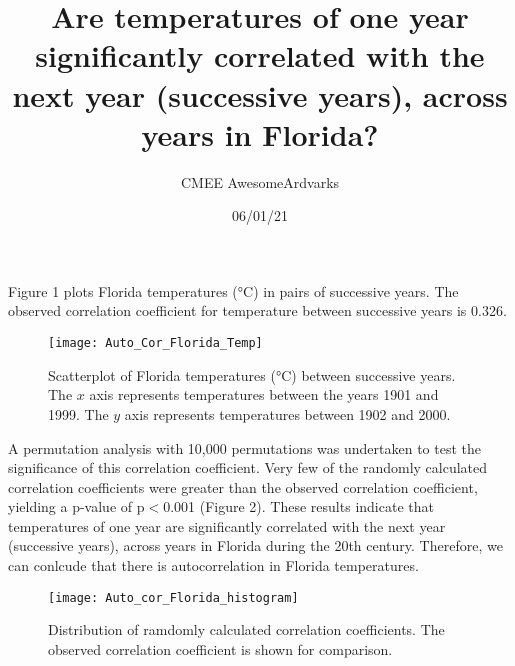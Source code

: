 \documentclass[11pt]{article}
\title{\vspace{-1.5cm}Are temperatures of one year significantly correlated with the next year (successive years), across years in Florida?} %
\author{CMEE AwesomeArdvarks}
\date{06/01/21}
\begin{document}
    \maketitle

    \noindent Figure 1 plots Florida temperatures (°C) in pairs of successive years. The observed correlation coefficient for temperature between successive years is 0.326. 

    \begin{figure}[h] %
        \centering %
        \texttt{[image: Auto\_Cor\_Florida\_Temp]} %
        \caption{Scatterplot of Florida temperatures (°C) between successive years. The \(x\) axis represents temperatures between the years 1901 and 1999. The \(y\) axis represents temperatures between 1902 and 2000.} %
    \end{figure}

    \noindent A permutation analysis with 10,000 permutations was undertaken to test the significance of this correlation coefficient. 
    Very few of the randomly calculated correlation coefficients were greater than the observed correlation coefficient, yielding a p-value of p\(<\)0.001 (Figure 2).
    These results indicate that temperatures of one year are significantly correlated with the next year (successive years), across years in Florida during the 20th century. Therefore, we can conlcude that there is autocorrelation in Florida temperatures. 

    \begin{figure}[h]
        \centering
        \texttt{[image: Auto\_cor\_Florida\_histogram]}
        \caption{Distribution of ramdomly calculated correlation coefficients. The observed correlation coefficient is shown for comparison.}
    \end{figure}
\end{document}
